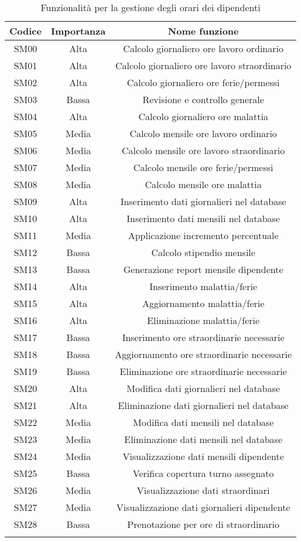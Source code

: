 \setlength{\extrarowheight}{7pt}
\begin{longtable}{|c|c|c|}
\hline 
\textbf{Codice} & \textbf{Importanza} & \textbf{Nome funzione}
\tabularnewline
\hline
SM00 & Alta & Calcolo giornaliero ore lavoro ordinario\tabularnewline
SM01 & Alta & Calcolo giornaliero ore lavoro straordinario\tabularnewline
SM02 & Alta & Calcolo giornaliero ore ferie/permessi\tabularnewline
SM03 & Bassa & Revisione e controllo generale\tabularnewline
SM04 & Alta & Calcolo giornaliero ore malattia\tabularnewline
SM05 & Media & Calcolo mensile ore lavoro ordinario\tabularnewline
SM06 & Media & Calcolo mensile ore lavoro straordinario\tabularnewline
SM07 & Media & Calcolo mensile ore ferie/permessi\tabularnewline
SM08 & Media & Calcolo mensile ore malattia\tabularnewline
SM09 & Alta & Inserimento dati giornalieri nel database\tabularnewline
SM10 & Alta & Inserimento dati mensili nel database\tabularnewline
SM11 & Media & Applicazione incremento percentuale\tabularnewline
SM12 & Bassa & Calcolo stipendio mensile\tabularnewline
SM13 & Bassa & Generazione report mensile dipendente\tabularnewline
SM14 & Alta & Inserimento malattia/ferie\tabularnewline
SM15 & Alta & Aggiornamento malattia/ferie\tabularnewline
SM16 & Alta & Eliminazione malattia/ferie\tabularnewline
SM17 & Bassa & Inserimento ore straordinarie necessarie\tabularnewline
SM18 & Bassa & Aggiornamento ore straordinarie necessarie\tabularnewline
SM19 & Bassa & Eliminazione ore straordinarie necessarie\tabularnewline
SM20 & Alta & Modifica dati giornalieri nel database\tabularnewline
SM21 & Alta & Eliminazione dati giornalieri nel database\tabularnewline
SM22 & Media & Modifica dati mensili nel database\tabularnewline
SM23 & Media & Eliminazione dati mensili nel database\tabularnewline
SM24 & Media & Visualizzazione dati mensili dipendente\tabularnewline
SM25 & Bassa & Verifica copertura turno assegnato\tabularnewline
SM26 & Media & Visualizzazione dati straordinari\tabularnewline
SM27 & Media & Visualizzazione dati giornalieri dipendente\tabularnewline
SM28 & Bassa & Prenotazione per ore di straordinario\tabularnewline
\hline
\caption{Funzionalità per la gestione degli orari dei dipendenti}
\label{tab:GestioneOrari}
\end{longtable}